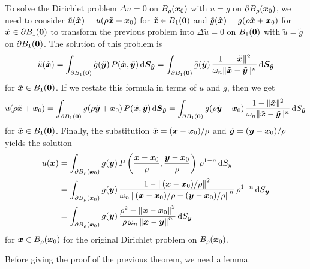 \begin{rmk}
To solve the Dirichlet problem    \label{laplace_exist_a_ball}
$\Delta u = 0$ on $B_\rho({\bm{x}}_0)$ with $u=g$ on
$\partial B_\rho({\bm{x}}_0)$, we need to consider
$\tilde{u}(\tilde{{\bm{x}}}) = u(\rho \tilde{{\bm{x}}} + {\bm{x}}_0)$ for
$\tilde{{\bm{x}}} \in B_1({\bm{0}})$ and
$\tilde{g}(\tilde{{\bm{x}}}) = g(\rho \tilde{{\bm{x}}} + {\bm{x}}_0)$ for
$\tilde{{\bm{x}}} \in \partial B_1({\bm{0}})$ to transform the previous
problem into  $\Delta \tilde{u} = 0$ on $B_1({\bm{0}})$ with
$\tilde{u}=\tilde{g}$ on $\partial B_1({\bm{0}})$.
The solution of this problem is
\[
\tilde{u}(\tilde{{\bm{x}}}) = \int_{\partial B_1({\bm{0}})}
\tilde{g}(\tilde{{\bm{y}}}) \,
P(\tilde{{\bm{x}}},\tilde{{\bm{y}}}) \,\mathrm{d}{{\bm{S}}_{\tilde{{\bm{y}}}}}
= \int_{\partial B_1({\bm{0}})}
\tilde{g}(\tilde{{\bm{y}}}) \, \frac{1-\|\tilde{{\bm{x}}}\|^2}
{\omega_n \|\tilde{{\bm{x}}}-\tilde{{\bm{y}}}\|^n}
\,\mathrm{d}{{\bm{S}}_{\tilde{{\bm{y}}}}}
\]
for $\tilde{{\bm{x}}} \in B_1({\bm{0}})$.
If we restate this formula in terms of $u$ and $g$, then we get
\[
u(\rho \tilde{{\bm{x}}} +{\bm{x}}_0) = \int_{\partial B_1({\bm{0}})}
g(\rho\tilde{{\bm{y}}}+{\bm{x}}_0) \, P(\tilde{{\bm{x}}},\tilde{{\bm{y}}})
\,\mathrm{d}{{\bm{S}}_{\tilde{{\bm{y}}}}}
= \int_{\partial B_1({\bm{0}})}
g(\rho \tilde{{\bm{y}}} + {\bm{x}}_0) \,
\frac{1-\|\tilde{{\bm{x}}}\|^2}{\omega_n \|\tilde{{\bm{x}}}-\tilde{{\bm{y}}}\|^n}
\,\mathrm{d}{S_{\tilde{{\bm{y}}}}}
\]
for $\tilde{{\bm{x}}} \in B_1({\bm{0}})$.
Finally, the substitution $\tilde{{\bm{x}}} = ({\bm{x}}-{\bm{x}}_0)/\rho$
and $\tilde{{\bm{y}}} = ({\bm{y}}-{\bm{x}}_0)/\rho$ yields the solution
\begin{align}
u({\bm{x}}) &= \int_{\partial B_\rho({\bm{x}}_0)}
g({\bm{y}}) \, P\left(\frac{{\bm{x}}-{\bm{x}}_0}{\rho},
\frac{{\bm{y}}-{\bm{x}}_0}{\rho}\right) \,\rho^{1-n}
\,\mathrm{d}{S}_{y} \nonumber \\
&= \int_{\partial B_\rho({\bm{x}}_0)} g({\bm{y}}) \,
\frac{1-\left\|({\bm{x}}-{\bm{x}}_0)/\rho\right\|^2}
{\omega_n \left\|({\bm{x}}-{\bm{x}}_0)/\rho -
({\bm{y}}-{\bm{x}}_0)/\rho\right\|^n}
\, \rho^{1-n} \,\mathrm{d}{S}_{{\bm{y}}} \nonumber \\
&=\int_{\partial B_\rho({\bm{x}}_0)} g({\bm{y}}) \,
\frac{\rho^2-\left\|{\bm{x}}-{\bm{x}}_0\right\|^2}
{\rho \, \omega_n \left\|{\bm{x}}-{\bm{y}}\right\|^n}
\,\mathrm{d}{S}_{{\bm{y}}}  \label{laplace_ball_formula}
\end{align}
for ${\bm{x}} \in B_\rho({\bm{x}}_0)$
for the original Dirichlet problem on $B_\rho({\bm{x}}_0)$.
\end{rmk}

Before giving the proof of the previous theorem, we need a lemma.

